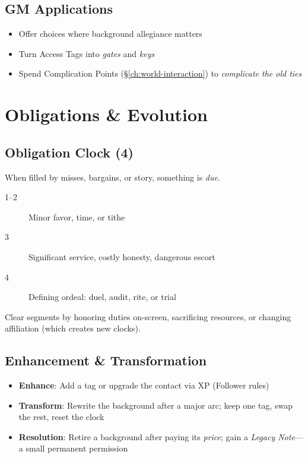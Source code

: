 \begin{multicols}{2}
\subsection*{GM Applications}
\begin{itemize}
\item Offer choices where background allegiance matters
\item Turn Access Tags into \emph{gates} and \emph{keys}
\item Spend Complication Points (\S\ref{ch:world-interaction}) to \emph{complicate the old ties}
\end{itemize}

\section{Obligations \& Evolution}
\label{sec:bg-obligation}

\subsection*{Obligation Clock (4)}
When filled by misses, bargains, or story, something is \emph{due}.
\begin{description}
\item[1--2] Minor favor, time, or tithe
\item[3] Significant service, costly honesty, dangerous escort
\item[4] Defining ordeal: duel, audit, rite, or trial
\end{description}
Clear segments by honoring duties on-screen, sacrificing resources, or changing affiliation (which creates new clocks).

\subsection*{Enhancement \& Transformation}
\begin{itemize}
\item \textbf{Enhance}: Add a tag or upgrade the contact via XP (Follower rules)
\item \textbf{Transform}: Rewrite the background after a major arc; keep one tag, swap the rest, reset the clock
\item \textbf{Resolution}: Retire a background after paying its \emph{price}; gain a \emph{Legacy Note}—a small permanent permission
\end{itemize}


\end{multicols}

